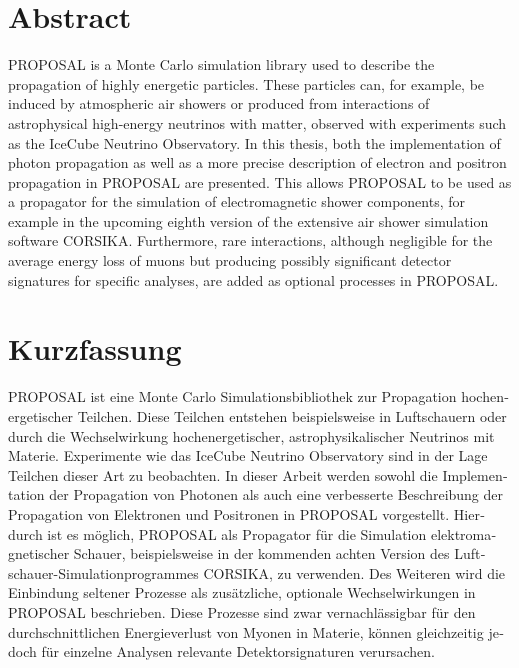 \thispagestyle{plain}

\section*{Abstract}

PROPOSAL is a \CC Monte Carlo simulation library used to describe the propagation of highly energetic particles. 
These particles can, for example, be induced by atmospheric air showers or produced from interactions of astrophysical high-energy neutrinos with matter, observed with experiments such as the IceCube Neutrino Observatory. 
In this thesis, both the implementation of photon propagation as well as a more precise description of electron and positron propagation in PROPOSAL are presented.
This allows PROPOSAL to be used as a propagator for the simulation of electromagnetic shower components, for example in the upcoming eighth version of the extensive air shower simulation software CORSIKA. 
Furthermore, rare interactions, although negligible for the average energy loss of muons but producing possibly significant detector signatures for specific analyses, are added as optional processes in PROPOSAL.

\section*{Kurzfassung}
\begin{german}

PROPOSAL ist eine \CC Monte Carlo Simulationsbibliothek zur Propagation hochenergetischer Teilchen.
Diese Teilchen entstehen beispielsweise in Luftschauern oder durch die Wechselwirkung hochenergetischer, astrophysikalischer Neutrinos mit Materie.
Experimente wie das IceCube Neutrino Observatory sind in der Lage Teilchen dieser Art zu beobachten.
In dieser Arbeit werden sowohl die Implementation der Propagation von Photonen als auch eine verbesserte Beschreibung der Propagation von Elektronen und Positronen in PROPOSAL vorgestellt.
Hierdurch ist es möglich, PROPOSAL als Propagator für die Simulation elektromagnetischer Schauer, beispielsweise in der kommenden achten Version des Luftschauer-Simulationprogrammes CORSIKA, zu verwenden.
Des Weiteren wird die Einbindung seltener Prozesse als zusätzliche, optionale Wechselwirkungen in PROPOSAL beschrieben.
Diese Prozesse sind zwar vernachlässigbar für den durchschnittlichen Energieverlust von Myonen in Materie, können gleichzeitig jedoch für einzelne Analysen relevante Detektorsignaturen verursachen. 

\end{german}
